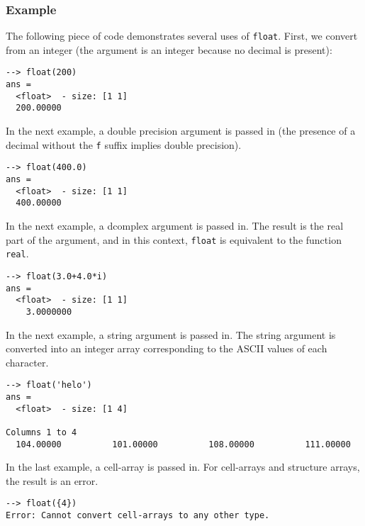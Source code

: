 \subsubsection{Example}
The following piece of code demonstrates several uses of \verb|float|.  First, we convert from an integer (the argument is an integer because no decimal is present):
\begin{verbatim}
--> float(200)
ans =
  <float>  - size: [1 1]
  200.00000
\end{verbatim}
In the next example, a double precision argument is passed in (the presence of a decimal without the \verb|f| suffix implies double precision).
\begin{verbatim}
--> float(400.0)
ans =
  <float>  - size: [1 1]
  400.00000
\end{verbatim}
In the next example, a dcomplex argument is passed in.  The result is the real part of the argument, and in this context, \verb|float| is equivalent to the function \verb|real|.
\begin{verbatim}
--> float(3.0+4.0*i)
ans =
  <float>  - size: [1 1]
    3.0000000
\end{verbatim}
In the next example, a string argument is passed in.  The string argument is converted into an integer array corresponding to the ASCII values of each character.
\begin{verbatim}
--> float('helo')
ans =
  <float>  - size: [1 4]
  
Columns 1 to 4
  104.00000          101.00000          108.00000          111.00000
\end{verbatim}
In the last example, a cell-array is passed in.  For cell-arrays and structure arrays, the result is an error.
\begin{verbatim}
--> float({4})
Error: Cannot convert cell-arrays to any other type.
\end{verbatim}
